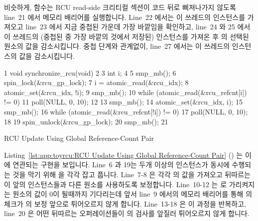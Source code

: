 비슷하게,  함수는 RCU read-side 크리티컬 섹션이
 코드 뒤로 삐져나가지 않도록 line~21 에서 메모리 배리어를
실행합니다.
Line~22 에서는 이 쓰레드의  인스턴스를 가져오고 line~23 에서
지금 중첩된  가운데 가장 바깥임을 확인하고, line~24 와 25
에서 이 쓰레드의 (중첩된  중 가장 바깥의 것에서 저장된)
 인스턴스를 가져온 후  의 선택된 원소의 값을
감소시킵니다.
중첩 단계와 관계없이, line~27 에서는 이 쓰레드의  인스턴스의
값을 감소시킵니다.
\iffalse

Similarly, the \co{rcu_read_unlock()} function executes a memory barrier
at line~21
to ensure that the RCU read-side critical section does not bleed out
after the \co{rcu_read_unlock()} code.
Line~22 picks up this thread's instance of \co{rcu_nesting}, and if
line~23 finds that this is the outermost \co{rcu_read_unlock()},
then lines~24 and 25 pick up this thread's instance of \co{rcu_read_idx}
(saved by the outermost \co{rcu_read_lock()}) and atomically decrements
the selected element of \co{rcu_refcnt}.
Regardless of the nesting level, line~27 decrements this thread's
instance of \co{rcu_nesting}.
\fi

\begin{listing}[tbp]
{ \scriptsize
\begin{verbbox}
  1 void synchronize_rcu(void)
  2 {
  3   int i;
  4
  5   smp_mb();
  6   spin_lock(&rcu_gp_lock);
  7   i = atomic_read(&rcu_idx);
  8   atomic_set(&rcu_idx, !i);
  9   smp_mb();
 10   while (atomic_read(&rcu_refcnt[i]) != 0) {
 11     poll(NULL, 0, 10);
 12   }
 13   smp_mb();
 14   atomic_set(&rcu_idx, i);
 15   smp_mb();
 16   while (atomic_read(&rcu_refcnt[!i]) != 0) {
 17     poll(NULL, 0, 10);
 18   }
 19   spin_unlock(&rcu_gp_lock);
 20   smp_mb();
 21 }
\end{verbbox}
}
\centering
\theverbbox
\caption{RCU Update Using Global Reference-Count Pair}
\label{lst:app:toyrcu:RCU Update Using Global Reference-Count Pair}
\end{listing}

Listing~\ref{lst:app:toyrcu:RCU Update Using Global Reference-Count Pair}
()
는 이에 연관되는  구현을 보입니다.
Line~6 과 19는 두개 이상의  인스턴스가 동시에 수행되는
것을 막기 위해  을 각각 잡고 풉니다.
Line~7-8 은 각각  의 값을 가져오고 뒤따르는  이
앞의 인스턴스들과 다른  원소를 사용하도록 보정합니다.
Line~10-12 는  로 가리켜지는 원소의 값이 0이 될때까지 기다리는데
앞서 line~9 에서의 메모리 배리어를 통해  의 체크가  의
보정 앞으로 튀어오르지 않게 합니다.
Line~13-18 은 이 과정을 반복하고, line~20 은 어떤 뒤따르는 오퍼레이션들이
 의 검사를 앞질러 튀어오르지 않게 합니다.
\iffalse

